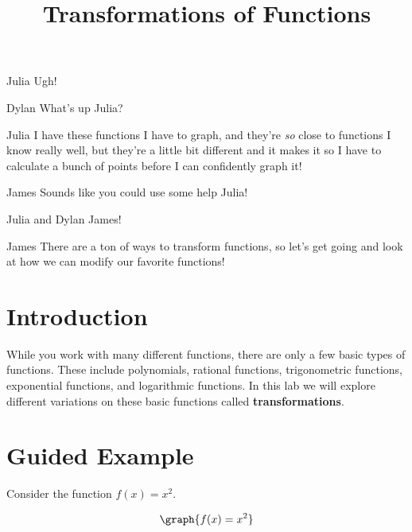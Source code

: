 \documentclass{ximera}
\title{Transformations of Functions}
\begin{document}
\maketitle
\begin{dialogue}
\item[Julia] Ugh!
\item[Dylan] What's up Julia?
\item[Julia] I have these functions I have to graph, and they're \textit{so} close to functions I know really well, but they're a little bit different and it makes it so I have to calculate a bunch of points before I can confidently graph it!
\item[James] Sounds like you could use some help Julia!
\item[Julia and Dylan] James!
\item[James] There are a ton of ways to transform functions, so let's get going and look at how we can modify our favorite functions!
\end{dialogue}
\section{Introduction}
While you work with many different functions, there are only a few basic types of functions. These include polynomials, rational functions, trigonometric functions, exponential functions, and logarithmic functions. In this lab we will explore different variations on these basic functions called \textbf{transformations}.
\section{Guided Example}
Consider the function $f(x)=x^2$.

\[
\graph{f(x)=x^2}
\]
\end{document}
